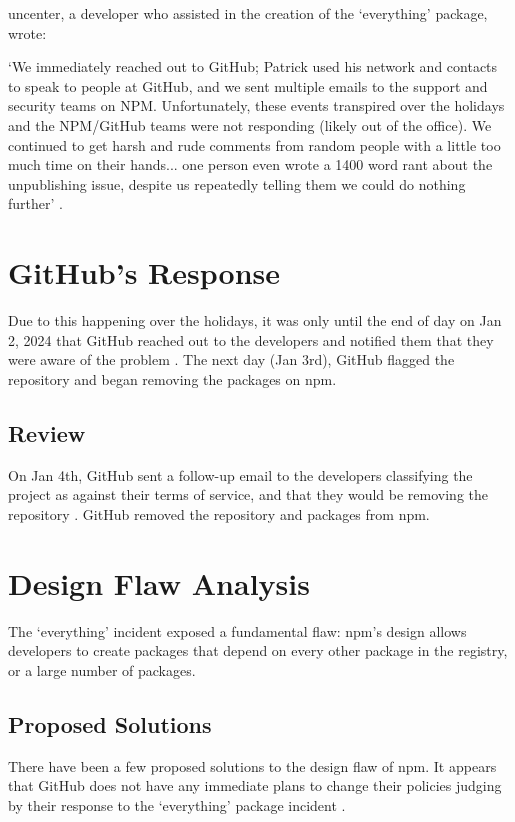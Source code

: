 \documentclass[acmsmall]{acmart}
\begin{document}
uncenter, a developer who assisted in the creation of the `everything' package,
wrote:

`We immediately reached out to GitHub; Patrick used his network and contacts to
speak to people at GitHub, and we sent multiple emails to the support and
security teams on NPM. Unfortunately, these events transpired over the holidays
and the NPM/GitHub teams were not responding (likely out of the office). We
continued to get harsh and rude comments from random people with a little too
much time on their hands... one person even wrote a 1400 word rant about the
unpublishing issue, despite us repeatedly telling them we could do nothing
further' \cite{uncenter-blog-everything}.

\section{GitHub's Response}
Due to this happening over the holidays, it was only until the end of day on Jan
2, 2024 that GitHub reached out to the developers and notified them that they
were aware of the problem \cite{uncenter-blog-everything}. The next day (Jan
3rd), GitHub flagged the repository and began removing the packages on npm.

\subsection{Review}
On Jan 4th, GitHub sent a follow-up email to the developers classifying the
project as against their terms of service, and that they would be removing the
repository \cite{uncenter-blog-everything}. GitHub removed the repository and
packages from npm.

\section{Design Flaw Analysis}
The `everything' incident exposed a fundamental flaw: npm's design allows
developers to create packages that depend on every other package in the
registry, or a large number of packages.

\subsection{Proposed Solutions}
There have been a few proposed solutions to the design flaw of npm. It appears
that GitHub does not have any immediate plans to change their policies judging
by their response to the `everything' package incident
\cite{uncenter-blog-everything}.
\end{document}
